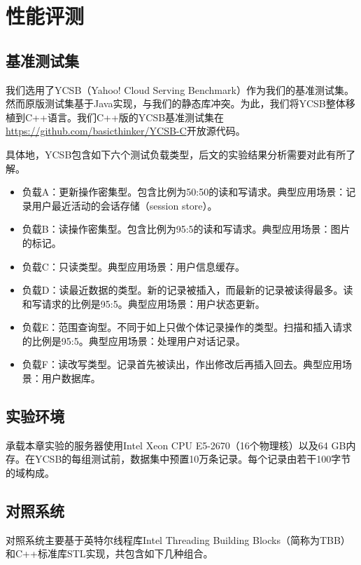 \section{性能评测}

\subsection{基准测试集}

我们选用了YCSB（Yahoo! Cloud Serving Benchmark）\cite{Cooper:2010:BCS:1807128.1807152}作为我们的基准测试集。然而原版测试集基于Java实现，与我们的静态库冲突。为此，我们将YCSB整体移植到C++语言。我们C++版的YCSB基准测试集在\url{https://github.com/basicthinker/YCSB-C}开放源代码。

具体地，YCSB包含如下六个测试负载类型，后文的实验结果分析需要对此有所了解。
\begin{itemize}
\item 负载A：更新操作密集型。包含比例为50:50的读和写请求。典型应用场景：记录用户最近活动的会话存储（session store）。
\item 负载B：读操作密集型。包含比例为95:5的读和写请求。典型应用场景：图片的标记。
\item 负载C：只读类型。典型应用场景：用户信息缓存。
\item 负载D：读最近数据的类型。新的记录被插入，而最新的记录被读得最多。读和写请求的比例是95:5。典型应用场景：用户状态更新。
\item 负载E：范围查询型。不同于如上只做个体记录操作的类型。扫描和插入请求的比例是95:5。典型应用场景：处理用户对话记录。
\item 负载F：读改写类型。记录首先被读出，作出修改后再插入回去。典型应用场景：用户数据库。
\end{itemize}

\subsection{实验环境}

承载本章实验的服务器使用Intel Xeon CPU E5-2670（16个物理核）以及64 GB内存。在YCSB的每组测试前，数据集中预置10万条记录。每个记录由若干100字节的域构成。

\subsection{对照系统}

对照系统主要基于英特尔线程库Intel Threading Building Blocks（简称为TBB）和C++标准库STL实现，共包含如下几种组合。

